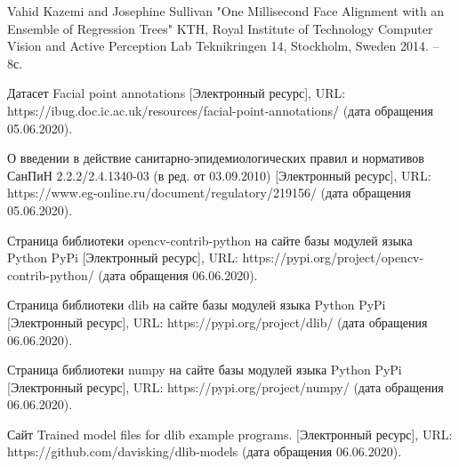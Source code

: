 \begin{thebibliography}{00}
	Vahid Kazemi and Josephine Sullivan
	"One Millisecond Face Alignment with an Ensemble of Regression Trees"
	KTH, Royal Institute of Technology
	Computer Vision and Active Perception Lab
	Teknikringen 14, Stockholm, Sweden 2014. -- 8с.

	
	Датасет Facial point annotations
	[Электронный ресурс],
	URL: https://ibug.doc.ic.ac.uk/resources/facial-point-annotations/
	(дата обращения 05.06.2020).
	
	О введении в действие санитарно-эпидемиологических правил и нормативов СанПиН 2.2.2/2.4.1340-03 (в ред. от 03.09.2010)
	[Электронный ресурс],
	URL: https://www.eg-online.ru/document/regulatory/219156/
	(дата обращения 05.06.2020).
	

	Страница библиотеки opencv-contrib-python на сайте базы модулей языка Python PyPi
	[Электронный ресурс],
	URL: https://pypi.org/project/opencv-contrib-python/
	(дата обращения 06.06.2020).

	Страница библиотеки dlib на сайте базы модулей языка Python PyPi
	[Электронный ресурс],
	URL: https://pypi.org/project/dlib/
	(дата обращения 06.06.2020).

	Страница библиотеки numpy на сайте базы модулей языка Python PyPi
	[Электронный ресурс],
	URL: https://pypi.org/project/numpy/
	(дата обращения 06.06.2020).
	
	Сайт Trained model files for dlib example programs.
	[Электронный ресурс],
	URL: https://github.com/davisking/dlib-models
	(дата обращения 06.06.2020).
	
	

	
	

\end{thebibliography}
\endgroup

\clearpage
